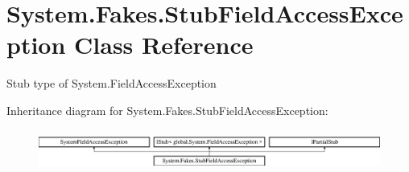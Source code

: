 \hypertarget{class_system_1_1_fakes_1_1_stub_field_access_exception}{\section{System.\-Fakes.\-Stub\-Field\-Access\-Exception Class Reference}
\label{class_system_1_1_fakes_1_1_stub_field_access_exception}
}


Stub type of System.\-Field\-Access\-Exception 


Inheritance diagram for System.\-Fakes.\-Stub\-Field\-Access\-Exception\-:\begin{figure}[H]
\begin{center}
\leavevmode
\includegraphics[height=1.338112cm]{class_system_1_1_fakes_1_1_stub_field_access_exception}
\end{center}
\end{figure}
